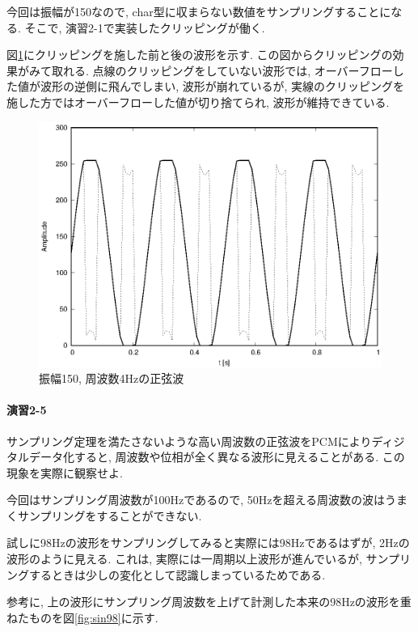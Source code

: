 \documentclass[titlepage]{jsarticle}
\begin{document}
        今回は振幅が150なので, char型に収まらない数値をサンプリングすることになる.
        そこで, 演習2-1で実装したクリッピングが働く.

        図\ref{fig:sin150f4}にクリッピングを施した前と後の波形を示す.
        この図からクリッピングの効果がみて取れる.
        点線のクリッピングをしていない波形では, オーバーフローした値が波形の逆側に飛んでしまい,
        波形が崩れているが, 実線のクリッピングを施した方ではオーバーフローした値が切り捨てられ, 波形が維持できている.
        
        \begin{figure}[ht]
            \centering
            \includegraphics[width=12cm]{images/sin150f4.eps}
            \caption{振幅150, 周波数4Hzの正弦波}
            \label{fig:sin150f4}
        \end{figure}

    \paragraph{演習2-5} サンプリング定理を満たさないような高い周波数の正弦波をPCMによりディジタルデータ化すると,
    周波数や位相が全く異なる波形に見えることがある. この現象を実際に観察せよ.

        今回はサンプリング周波数が100Hzであるので, 50Hzを超える周波数の波はうまくサンプリングをすることができない.

        試しに98Hzの波形をサンプリングしてみると実際には98Hzであるはずが, 2Hzの波形のように見える.
        これは, 実際には一周期以上波形が進んでいるが, サンプリングするときは少しの変化として認識しまっているためである.
        
        参考に, 上の波形にサンプリング周波数を上げて計測した本来の98Hzの波形を重ねたものを図\ref{fig:sin98}に示す.
\end{document}
